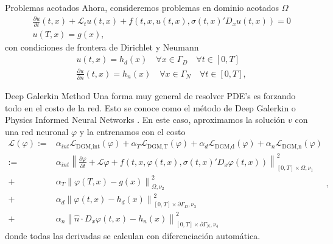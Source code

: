 \documentclass[aspectratio=169,xcolor=dvipsnames]{beamer}
\newcommand{\dpartial}[2]{\frac{\partial #1}{\partial #2}}
\newcommand{\norm}[1]{\left\lVert#1\right\rVert}
\begin{document}
\begin{frame}{Problemas acotados}
Ahora, consideremos problemas en dominio acotados $\Omega$ 
	\begin{equation}
		\label{eqn:FKNolinealBoun}
		\begin{split}
			&\dpartial{u}{t}(t,x)+\mathcal{L}_t u(t,x)+f(t,x,u(t,x),\sigma(t,x)' D_x u(t,x))=0\\
			&u(T,x)=g(x),
		\end{split}
	\end{equation} 
con condiciones de frontera de Dirichlet y Neumann
\begin{align}
	&u(t,x)=h_d(x) \quad \forall x\in \Gamma_D \quad \forall t\in[0,T] \label{eqn:DirichletBoundary}\\
	&\dpartial{u}{n}(t,x)=h_n(x) \quad \forall x\in \Gamma_N \quad \forall t\in[0,T] \label{eqn:NeumanBoundary},
\end{align}
\end{frame}

\begin{frame}{Deep Galerkin Method}
	Una forma muy general de resolver PDE's es forzando todo en el costo de la red. Esto se conoce como el método de Deep Galerkin o Physics Informed Neural Networks \parencite{sirignano_dgm_2018}. En este caso, aproximamos la solución $v$ con una red neuronal $\varphi$ y la entrenamos con el costo
	\begin{equation}
		\label{eqn:DGMLoss}
		\begin{split}
			\mathcal{L}(\varphi):=&\alpha_{int}\mathcal{L}_{\text{DGM,int}}(\varphi)+\alpha_{T}\mathcal{L}_{\text{DGM,T}}(\varphi)+\alpha_{d}\mathcal{L}_{\text{DGM,d}}(\varphi)+\alpha_{n}\mathcal{L}_{\text{DGM,n}}(\varphi) \\
			:=&\alpha_{int}\norm{\dpartial{\varphi}{t}+\mathcal{L}\varphi+f(t,x,\varphi(t,x),\sigma(t,x)'D_x \varphi(t,x))}_{[0,T]\times \Omega,\nu_1}^2\\
			+&\alpha_{T}\norm{\varphi(T,x)-g(x)}_{\Omega,\nu_2}^2\\
			+&\alpha_{d}\norm{\varphi(t,x)-h_d(x)}_{[0,T]\times \partial \Gamma_D,\nu_3 }^2\\
			+&\alpha_{n}\norm{\hat{n}\cdot D_x \varphi(t,x)-h_n(x)}_{[0,T]\times \partial \Gamma_N,\nu_4 }^2
		\end{split},
	\end{equation}
donde todas las derivadas se calculan con diferenciación automática.
\end{frame}
\end{document}
